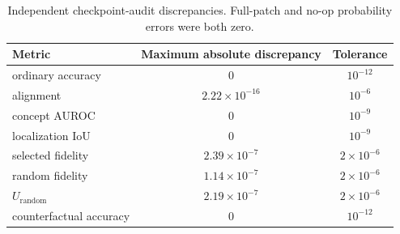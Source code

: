 \begin{table}[h]
\caption{Independent checkpoint-audit discrepancies. Full-patch and no-op probability errors were both zero.}
\label{tab:audit}
\centering
\small
\begin{tabular}{lcc}
\toprule
Metric & Maximum absolute discrepancy & Tolerance \\
\midrule
ordinary accuracy & 0 & $10^{-12}$ \\
alignment & $2.22\times10^{-16}$ & $10^{-6}$ \\
concept AUROC & 0 & $10^{-9}$ \\
localization IoU & 0 & $10^{-9}$ \\
selected fidelity & $2.39\times10^{-7}$ & $2\times10^{-6}$ \\
random fidelity & $1.14\times10^{-7}$ & $2\times10^{-6}$ \\
$U_{\mathrm{random}}$ & $2.19\times10^{-7}$ & $2\times10^{-6}$ \\
counterfactual accuracy & 0 & $10^{-12}$ \\
\bottomrule
\end{tabular}
\end{table}